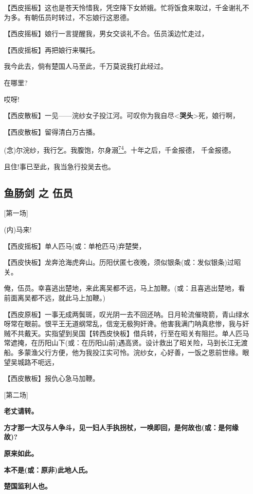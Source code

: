 【西皮摇板】这也是苍天怜惜我，凭空降下女娇娥。忙将饭食来取过，千金谢礼不为多。有朝伍员时转过，不忘娘行这恩德。

【西皮摇板】娘行一言提醒我，男女交谈礼不合。伍员溪边忙走过，

【西皮摇板】再把娘行来嘱托。

我今此去，倘有楚国人马至此，千万莫说我打此经过。

在哪里?

哎呀!

【西皮散板】一见------浣纱女子投江河。可叹你为我自尽\textless{}\textbf{哭头}\textgreater{}死，娘行啊，

【西皮散板】留得清白万古播。

(念)尔浣纱，我行乞。我腹饱，尔身溺\protect\hyperlink{fn74}{\textsuperscript{74}}。十年之后，千金报德，
千金报德。

且住!事已至此，我当急行投吴去也。

\hypertarget{ux9c7cux80a0ux5251-ux4e4b-ux4f0dux5458}{%
\subsection{鱼肠剑 之
伍员}\label{ux9c7cux80a0ux5251-ux4e4b-ux4f0dux5458}}

{[}第一场{]}

(内)马来!

【西皮摇板】单人匹马(或：单枪匹马)弃楚樊，

【西皮快板】龙奔沧海虎奔山。历阳伏匿七夜晚，须似银条(或：发似银条)过昭关。

俺，伍员。幸喜逃出楚地，来此离吴都不远，马上加鞭。(或：且喜逃出楚地，看前面离吴都不远，就此马上加鞭。)

【西皮原板】一事无成两鬓斑，叹光阴一去不回还呐。日月轮流催晓箭，青山绿水呀常在眼前。恨平王无道纲常乱，信宠无极狗奸谗。他害我满门呐真悲惨，我与奸贼不共戴天。实指望到吴国【转西皮快板】借兵转，行至在昭关有阻拦。单人匹马常遮掩，在历阳山下(或：在历阳山前)遇高贤。设计救出了昭关险，马到长江无渡船。多蒙渔父行方便，他为我投江实可怜。浣纱女，心好善，一饭之恩前世缘。眼望吴城路不呃远，

【西皮散板】报仇心急马加鞭。

{[}第二场{]}

\textbf{老丈请转。}

\textbf{方才那一大汉与人争斗，见一妇人手执拐杖，一唤即回，是何故也(或：是何缘故)?}

\textbf{原来如此。}

\textbf{本不是(或：原非)此地人氏。}

\textbf{楚国监利人也。}

